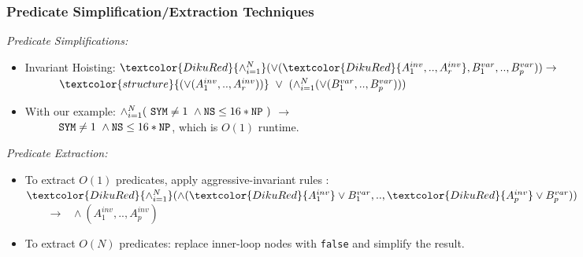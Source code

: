 \documentclass{beamer}
\renewcommand{\emph}[1]{\textcolor{structure}{#1}}
\newcommand{\emp}[1]{\textcolor{DikuRed}{ #1}}
\begin{document}
\begin{frame}[fragile,t]
  \frametitle{Predicate Simplification/Extraction Techniques}

\bigskip
\emp{{\em Predicate Simplifications:}}
\begin{itemize}
    \item Invariant Hoisting: $\emp{\wedge_{i=1}^{N}}(\vee(\emp{A_1^{inv}, .., A_r^{inv}}, B_1^{var}, .., B_p^{var})) \rightarrow$ \smallskip \\
            $\mbox{ }\mbox{ }\mbox{ }\mbox{ }$ $\emph{(\vee(A_1^{inv}, .., A_r^{inv}))}\mbox{ }\vee\mbox{ } (\wedge_{i=1}^{N}(\vee(B_1^{var}, .., B_p^{var})))$ \pause \smallskip
    \item With our example: \emp{$\wedge_{i=1}^N(\mbox{ }{\tt SYM}\neq 1\mbox{ }\wedge {\tt NS}\leq 16*{\tt NP}\mbox{ })$} $\rightarrow$ \smallskip \\ $\mbox{ }\mbox{ }\mbox{ }\mbox{ }$ \emph{${\tt SYM}\neq 1\mbox{ }\wedge {\tt NS}\leq 16*{\tt NP}$}, which is $O(1)$ runtime.  
\end{itemize}

\bigskip

\pause

\emp{{\em Predicate Extraction:}}
\begin{itemize}
    \item To extract $O(1)$ predicates, apply aggressive-invariant rules : \smallskip \\
            $\emp{\wedge_{i=1}^{N}}(\wedge(\emp{A_1^{inv}}\vee B_1^{var}, .., \emp{A_p^{inv}} \vee B_p^{var}))$  \emph{$\mbox{ }\mbox{ }\mbox{ }\rightarrow\mbox{ }\wedge(A_1^{inv}, .., A_p^{inv})$} \pause \bigskip

    \item To extract $O(N)$ predicates: replace inner-loop nodes with {\tt false} and simplify the result.
\end{itemize}

\end{frame}
\end{document}
